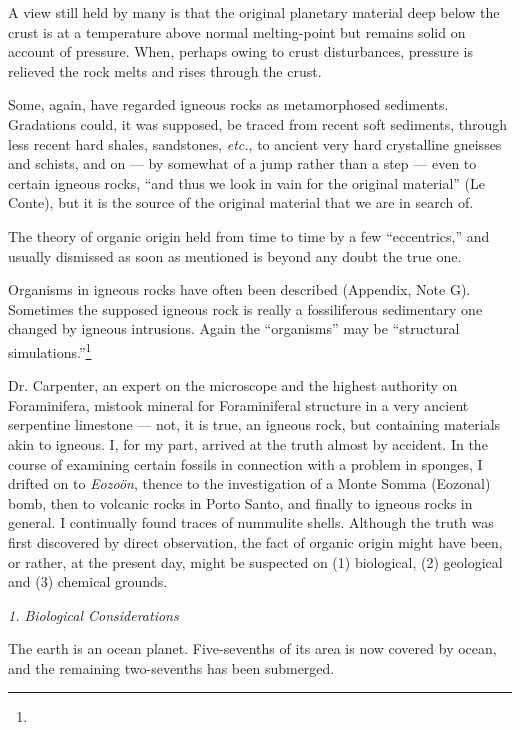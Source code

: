 \documentclass[a4paper, 12pt, oneside]{article}
\begin{document}
A view still held by many is that the original planetary material deep below the crust is at a temperature above normal melting-point but remains solid on account of pressure. When, perhaps owing to crust disturbances, pressure is relieved the rock melts and rises through the crust.

Some, again, have regarded igneous rocks as metamorphosed sediments. Gradations could, it was supposed, be traced from recent soft sediments, through less recent hard shales, sandstones, \emph{etc.}, to ancient very hard crystalline gneisses and schists, and on --- by somewhat of a jump rather than a step --- even to certain igneous rocks, ``and thus we look in vain for the original material'' (Le Conte), but it is the source of the original material that we are in search of.

The theory of organic origin held from time to time by a few ``eccentrics,'' and usually dismissed as soon as mentioned is beyond any doubt the true one.

Organisms in igneous rocks have often been described (Appendix, Note G). Sometimes the supposed igneous rock is really a fossiliferous sedimentary one changed by igneous intrusions. Again the ``organisms'' may be ``structural simulations.''\footnote{}

Dr. Carpenter, an expert on the microscope and the highest authority on Foraminifera, mistook mineral for Foraminiferal structure in a very ancient serpentine limestone --- not, it is true, an igneous rock, but containing materials akin to igneous. I, for my part, arrived at the truth almost by accident. In the course of examining certain fossils in connection with a problem in sponges, I drifted on to \emph{Eozoön}, thence to the investigation of a Monte Somma (Eozonal) bomb, then to volcanic rocks in Porto Santo, and finally to igneous rocks in general. I continually found traces of nummulite shells. Although the truth was first discovered by direct observation, the fact of organic origin might have been, or rather, at the present day, might be suspected on (1) biological, (2) geological and (3) chemical grounds.

\bigskip
\centerline{\emph{1. Biological Considerations}}

The earth is an ocean planet. Five-sevenths of its area is now covered by ocean, and the remaining two-sevenths has been submerged.
\end{document}
